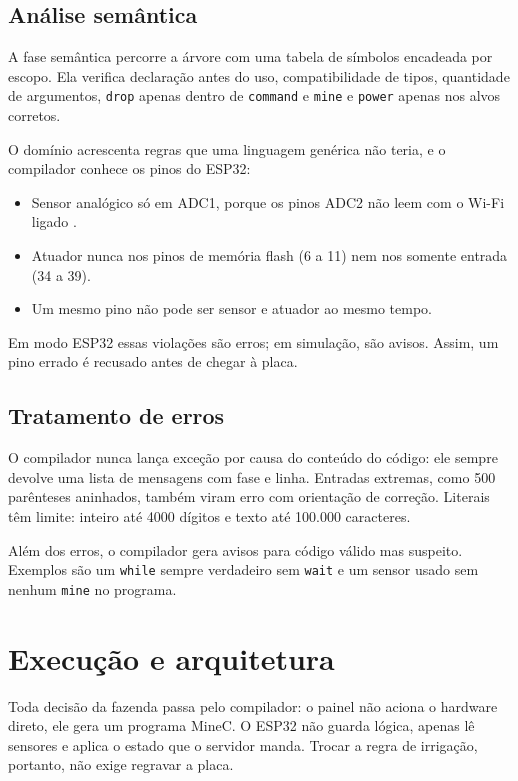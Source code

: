\documentclass[11pt,a4paper]{article}
\newcommand{\cod}[1]{\texttt{#1}}
\begin{document}
\subsection{Análise semântica}

A fase semântica percorre a árvore com uma tabela de símbolos encadeada por escopo. Ela verifica declaração antes do uso, compatibilidade de tipos, quantidade de argumentos, \cod{drop} apenas dentro de \cod{command} e \cod{mine} e \cod{power} apenas nos alvos corretos.

O domínio acrescenta regras que uma linguagem genérica não teria, e o compilador conhece os pinos do ESP32:

\begin{itemize}
  \item Sensor analógico só em ADC1, porque os pinos ADC2 não leem com o Wi-Fi ligado \cite{espressif}.
  \item Atuador nunca nos pinos de memória flash (6 a 11) nem nos somente entrada (34 a 39).
  \item Um mesmo pino não pode ser sensor e atuador ao mesmo tempo.
\end{itemize}

\medskip
Em modo ESP32 essas violações são erros; em simulação, são avisos. Assim, um pino errado é recusado antes de chegar à placa.

\subsection{Tratamento de erros}

O compilador nunca lança exceção por causa do conteúdo do código: ele sempre devolve uma lista de mensagens com fase e linha. Entradas extremas, como 500 parênteses aninhados, também viram erro com orientação de correção. Literais têm limite: inteiro até 4000 dígitos e texto até 100.000 caracteres.

Além dos erros, o compilador gera avisos para código válido mas suspeito. Exemplos são um \cod{while} sempre verdadeiro sem \cod{wait} e um sensor usado sem nenhum \cod{mine} no programa.

\section{Execução e arquitetura}\label{sec:arquitetura}

Toda decisão da fazenda passa pelo compilador: o painel não aciona o hardware direto, ele gera um programa MineC. O ESP32 não guarda lógica, apenas lê sensores e aplica o estado que o servidor manda. Trocar a regra de irrigação, portanto, não exige regravar a placa.
\end{document}
